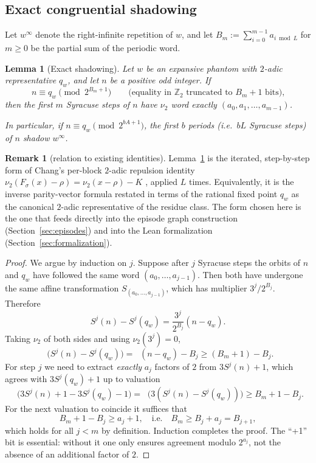 \documentclass[11pt,a4paper]{article}
\newtheorem{lemma}[theorem]{Lemma}
\theoremstyle{definition}
\newtheorem{remark}[theorem]{Remark}
\DeclareMathOperator{\nutwo}{\nu_2}
\newcommand{\Zp}{\mathbb{Z}_2}
\begin{document}
\subsection{Exact congruential shadowing}

Let $w^\infty$ denote the right-infinite repetition of $w$, and let
$B_m := \sum_{i=0}^{m-1} a_{i \bmod L}$ for $m \ge 0$ be the partial
sum of the periodic word.

\begin{lemma}[Exact shadowing]\label{lem:shadowing}
Let $w$ be an expansive phantom with $2$-adic representative $q_w$,
and let $n$ be a positive odd integer. If
\[
n \equiv q_w \pmod{2^{B_m+1}}
\qquad\text{(equality in $\Zp$ truncated to $B_m+1$ bits),}
\]
then the first $m$ Syracuse steps of $n$ have $\nu_2$ word exactly
$(a_0, a_1, \ldots, a_{m-1})$.

In particular, if $n \equiv q_w \pmod{2^{bA+1}}$, the first $b$
periods (i.e.\ $bL$ Syracuse steps) of $n$ shadow $w^\infty$.
\end{lemma}

\begin{remark}[relation to existing identities]
\label{rem:lemma-context}
Lemma~\ref{lem:shadowing} is the iterated, step-by-step form of
Chang's per-block $2$-adic repulsion identity
$\nu_2(F_\sigma(x) - \rho) = \nu_2(x - \rho) - K$
\cite[Prop.~7.4]{chang2026}, applied $L$ times. Equivalently, it is
the inverse parity-vector formula \cite[Lemma~1]{rozier2025}
restated in terms of the rational fixed point $q_w$ as the
canonical $2$-adic representative of the residue class. The form
chosen here is the one that feeds directly into the episode graph
construction (Section~\ref{sec:episodes}) and into the Lean
formalization (Section~\ref{sec:formalization}).
\end{remark}

\begin{proof}
We argue by induction on $j$. Suppose after $j$ Syracuse steps the
orbits of $n$ and $q_w$ have followed the same word
$(a_0,\ldots,a_{j-1})$. Then both have undergone the same affine
transformation $S_{(a_0,\ldots,a_{j-1})}$, which has multiplier
$3^j / 2^{B_j}$. Therefore
\[
S^j(n) - S^j(q_w) = \frac{3^j}{2^{B_j}} (n - q_w).
\]
Taking $\nu_2$ of both sides and using $\nu_2(3^j)=0$,
\[
\nutwo\bigl(S^j(n) - S^j(q_w)\bigr)
= \nutwo(n - q_w) - B_j
\ge (B_m + 1) - B_j.
\]
For step $j$ we need to extract \emph{exactly} $a_j$ factors of $2$
from $3 S^j(n) + 1$, which agrees with $3 S^j(q_w) + 1$ up to
valuation
\[
\nutwo\bigl(3 S^j(n) + 1 - 3 S^j(q_w) - 1\bigr)
= \nutwo\bigl(3(S^j(n) - S^j(q_w))\bigr)
\ge B_m + 1 - B_j.
\]
For the next valuation to coincide it suffices that
\[
B_m + 1 - B_j \ge a_j + 1,
\quad\text{i.e.}\quad
B_m \ge B_j + a_j = B_{j+1},
\]
which holds for all $j < m$ by definition. Induction completes the
proof. The ``+1'' bit is essential: without it one only ensures
agreement modulo $2^{a_j}$, not the absence of an additional factor
of $2$.
\end{proof}
\end{document}
